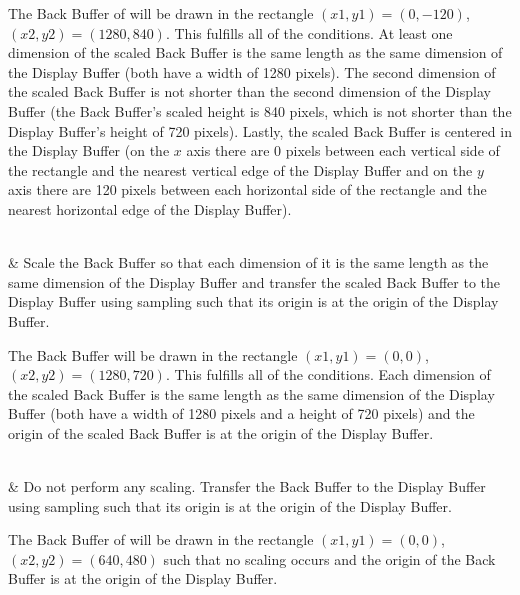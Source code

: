 \begin{libreqtab2}
 \begin{example}
 The Back Buffer of  will be drawn in the rectangle $(x1,y1) = (0,-120)$, $(x2,y2) = (1280,840)$. This fulfills all of the conditions. At least one dimension of the scaled Back Buffer is the same length as the same dimension of the Display Buffer (both have a width of 1280 pixels). The second dimension of the scaled Back Buffer is not shorter than the second dimension of the Display Buffer (the Back Buffer's scaled height is 840 pixels, which is not shorter than the Display Buffer's height of 720 pixels). Lastly, the scaled Back Buffer is centered in the Display Buffer (on the $x$ axis there are 0 pixels between each vertical side of the rectangle and the nearest vertical edge of the Display Buffer and on the $y$ axis there are 120 pixels between each horizontal side of the rectangle and the nearest horizontal edge of the Display Buffer).
 \end{example} 
 \\
 & Scale the Back Buffer so that each dimension of it is the same length as the same dimension of the Display Buffer and transfer the scaled Back Buffer to the Display Buffer using sampling such that its origin is at the origin of the Display Buffer.
 
 \begin{example}
 The Back Buffer will be drawn in the rectangle $(x1,y1) = (0,0)$, $(x2,y2) = (1280,720)$. This fulfills all of the conditions. Each dimension of the scaled Back Buffer is the same length as the same dimension of the Display Buffer (both have a width of 1280 pixels and a height of 720 pixels) and the origin of the scaled Back Buffer is at the origin of the Display Buffer.
 \end{example}
 \\
 & Do not perform any scaling. Transfer the Back Buffer to the Display Buffer using sampling such that its origin is at the origin of the Display Buffer.
 
 \begin{example}
 The Back Buffer of  will be drawn in the rectangle $(x1,y1) = (0,0)$, $(x2,y2) = (640,480)$ such that no scaling occurs and the origin of the Back Buffer is at the origin of the Display Buffer.
 \end{example}
 \\
\end{libreqtab2}
